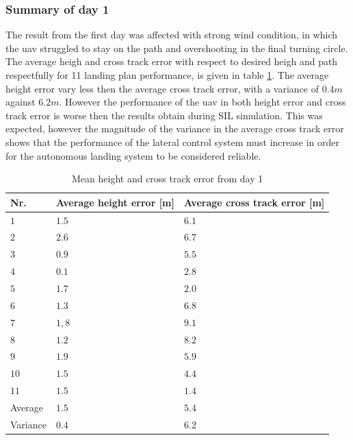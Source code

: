 \subsubsection{Summary of day 1}\label{sss:summaryDay1}
The result from the first day was affected with strong wind condition, in which the \gls{uav} struggled to stay on the path and overshooting in the final turning circle. The average heigh and cross track error with respect to desired heigh and path respectfully for 11 landing plan performance, is given in table \ref{tb:Day1HeightCrossTrack}. The average height error vary less then the average cross track error, with a variance of $0.4 m$ against $6.2 m$. However the performance of the \gls{uav} in both height error and cross track error is worse then the results obtain during SIL simulation. This was expected, however the magnitude of the variance in the average cross track error shows that the performance of the lateral control system must increase in order for the autonomous landing system to be considered reliable. 
\begin{table}[H]
\centering
\begin{tabular}{| l | l | l |}
\hline
\textbf{Nr.} 	& \textbf{Average height error [m]} 	& \textbf{Average cross track error [m]}  \\ \hline
$1$				& $1.5$							& $6.1$								\\ \hline
$2$				& $2.6$							& $6.7$								\\ \hline
$3$				& $0.9$							& $5.5$								\\ \hline
$4$				& $0.1$							& $2.8$								\\ \hline
$5$				& $1.7$							& $2.0$								\\ \hline
$6$				& $1.3$							& $6.8$								\\ \hline
$7$				& $1,8$							& $9.1$								\\ \hline
$8$				& $1.2$							& $8.2$								\\ \hline
$9$				& $1.9$							& $5.9$								\\ \hline
$10$			& $1.5$							& $4.4$								\\ \hline
$11$			& $1.5$							& $1.4$								\\ \hline
Average			& $1.5$							& $5.4$								\\ \hline
Variance		& $0.4$							& $6.2$								\\ \hline
\end{tabular}
\caption{Mean height and cross track error from day 1}
\label{tb:Day1HeightCrossTrack}
\end{table}
